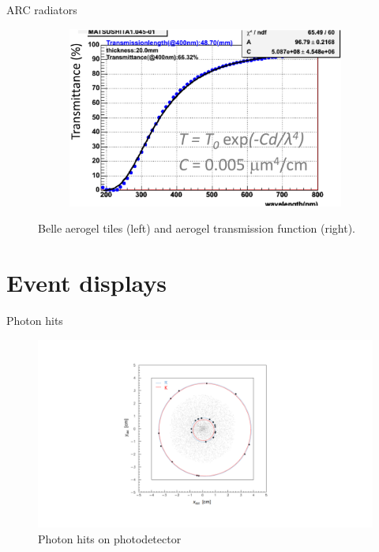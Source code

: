 \documentclass{beamer}
\begin{document}
\begin{frame}{ARC radiators}
\begin{figure}
\begin{subfigure}{0.25\textwidth}
    \end{subfigure}%
    \hspace{0.2cm}
    \begin{subfigure}{0.25\textwidth}
      \includegraphics[width = 1.0\textwidth]{Plots/AerogelTransmission.png}
    \end{subfigure}
    \caption{Belle aerogel tiles (left) and aerogel transmission function (right).}
  \end{figure}
\end{frame}

\section{Event displays}
\begin{frame}{Photon hits}
  \begin{figure}
    \centering
    \includegraphics[width = 1.0\textwidth, trim = {4cm 2cm 4cm 2cm}, clip = true]{Plots/Display1.pdf}
    \caption{Photon hits on photodetector}
  \end{figure}
\end{frame}
\end{document}
